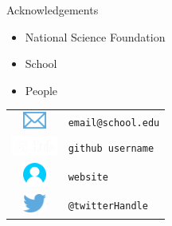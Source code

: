 \documentclass[12pt]{beamer}
\begin{document}
\begin{frame}

{\large \textcolor{boss5}{Acknowledgements}}

  \begin{itemize}
    \item National Science Foundation
    \item School
    \item People
  \end{itemize}

  \begin{flushright}
    \begin{tabular}{cl}
    \includegraphics[width=0.75cm]{figs/email.png} & \texttt{email@school.edu} \\
    \includegraphics[width=1.5cm]{figs/octocat.png} & \texttt{github username} \\
    \includegraphics[width=0.75cm]{figs/user.png} & \texttt{website}\\
    \includegraphics[width=0.75cm]{figs/twitter.png} & \texttt{@twitterHandle} \\
   \end{tabular}
  \end{flushright}
\end{frame}






















\begin{frame}


\end{frame}
\end{document}
